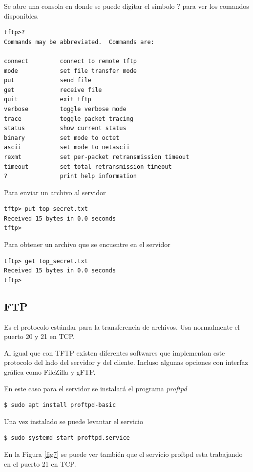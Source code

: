 \documentclass[12pt]{article}
\begin{document}
Se abre una consola en donde se puede digitar el símbolo ? para ver los comandos disponibles.
\begin{lstlisting}[frame=single]
tftp>?
Commands may be abbreviated.  Commands are:

connect         connect to remote tftp
mode            set file transfer mode
put             send file
get             receive file
quit            exit tftp
verbose         toggle verbose mode
trace           toggle packet tracing
status          show current status
binary          set mode to octet
ascii           set mode to netascii
rexmt           set per-packet retransmission timeout
timeout         set total retransmission timeout
?               print help information

\end{lstlisting}
Para enviar un archivo al servidor
\begin{lstlisting}[frame=single]
tftp> put top_secret.txt
Received 15 bytes in 0.0 seconds
tftp>
\end{lstlisting}

Para obtener un archivo que se encuentre en el servidor
\begin{lstlisting}[frame=single]
tftp> get top_secret.txt
Received 15 bytes in 0.0 seconds
tftp>
\end{lstlisting}

\subsection{FTP}

Es el protocolo estándar para la transferencia de archivos. Usa normalmente el puerto 20 y 21 en TCP.

Al igual que con TFTP existen diferentes softwares que implementan este protocolo del lado del servidor y del cliente. Incluso algunas opciones con interfaz gráfica como FileZilla y gFTP. 

En este caso para el servidor se instalará el programa \emph{proftpd}

\begin{lstlisting}[frame=single]
$ sudo apt install proftpd-basic
\end{lstlisting}

Una vez instalado se puede levantar el servicio
\begin{lstlisting}[frame=single]
$ sudo systemd start proftpd.service
\end{lstlisting}

En la Figura \ref{fig7} se puede ver también que el servicio proftpd esta trabajando en el puerto 21 en TCP. 
\end{document}
